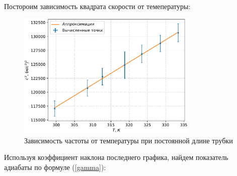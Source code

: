 \documentclass[a4paper,12pt]{article} %
\begin{document}
Постороим зависимость квадрата скорости от темепературы:

\begin{figure}[h!]
    \centering
    \includegraphics[width=0.77\textwidth]{c.pdf}
    \caption{Зависимость частоты от температуры при постоянной длине трубки}
\end{figure}

Используя коэффициент наклона последнего графика, найдем показатель адиабаты по формуле (\ref{gamma}):
\begin{equation}
	
\end{equation}


\end{document}
